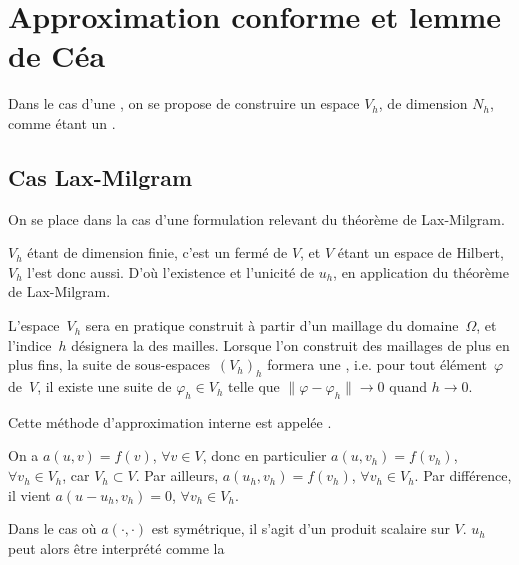 \medskip
\section{Approximation conforme et lemme de Céa}\label{Sec-Cea}

Dans le cas d'une , on se propose de construire un espace $V_h$, de dimension $N_h$, comme étant un .


\medskip
\subsection{Cas Lax-Milgram}

On se place dans la cas d'une formulation relevant du théorème de Lax-Milgram.

$V_h$ étant de dimension finie, c'est un fermé de $V$, et $V$ étant un espace de Hilbert, $V_h$ l'est donc aussi. D'où l'existence et l'unicité de $u_h$, en application du théorème de Lax-Milgram.

\medskip
L'espace~$V_h$ sera en pratique construit à partir d'un maillage du domaine~$\Omega$, et l'indice~$h$ désignera la  des mailles. Lorsque l'on construit des maillages de plus en plus fins, la suite de sous-espaces~$(V_h)_h$ formera une  , i.e. pour tout élément~$\varphi$ de~$V$, il existe une suite de $\varphi_h\in V_h$ telle que $\|\varphi-\varphi_h\|\rightarrow 0$ quand $h\rightarrow 0$.

Cette méthode d'approximation interne est appelée  .



\medskip
\begin{remarque}[Signification de~$u_h$]
On a $a(u,v) = f(v)$, $\forall v\in V$, donc en particulier $a(u,v_h) = f(v_h)$, $\forall v_h\in V_h$, car $V_h\subset V$. Par ailleurs, $a(u_h,v_h) = f(v_h)$, $\forall v_h\in V_h$. Par différence, il vient $a(u-u_h,v_h) = 0$, $\forall v_h\in V_h$.

Dans le cas où $a(\cdot,\cdot)$ est symétrique, il s'agit d'un produit scalaire sur $V$. $u_h$ peut alors être interprété comme la 
\end{remarque}

